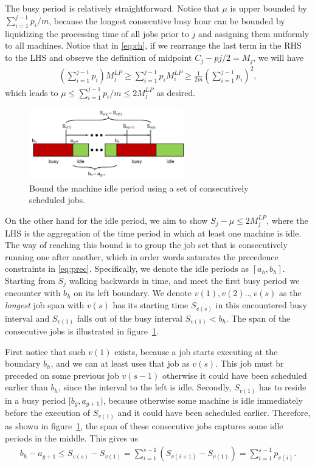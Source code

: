 The busy period is relatively straightforward. Notice that $\mu$ is upper bounded by $\sum_{i=1}^{j-1} p_i /m$, because the longest consecutive busy hour can be bounded by liquidizing the processing time of all jobs prior to $j$ and assigning them uniformly to all machines. Notice that in \eqref{eq:ch}, if we rearrange the last term in the RHS to the LHS and observe the definition of midpoint $C_j-pj/2 = M_j$, we will have 
\begin{align}
\left(\sum_{i=1}^{j-1}p_i\right)M^{LP}_j \geq \sum_{i=1}^{j-1} p_i M^{LP}_i \geq \frac{1}{2m}\left(\sum_{i=1}^{j-1}p_i\right)^2,
\end{align}
which leads to $\mu \leq \sum_{i=1}^{j-1} p_i /m \leq 2 M^{LP}_j$ as desired. 

\begin{figure}[h]
	\centering
	\includegraphics[width=0.6\textwidth]{figs/4-approx-1.pdf}
	\caption{Bound the machine idle period using a set of consecutively scheduled jobs.}
	\label{fig:4-approx}
\end{figure}

On the other hand for the idle period, we aim to show $S_j - \mu \leq 2 M^{LP}_j$, where the LHS is the aggregation of the time period in which at least one machine is idle. The way of reaching this bound is to group the job set that is consecutively running one after another, which in order words saturates the precedence constraints in \eqref{eq:prec}. Specifically, we denote the idle periods as $[a_h, b_h]$. Starting from $S_j$ walking backwards in time, and meet the first busy period we encounter with $b_h$ on its left boundary. We denote $v(1), v(2) .., v(s)$ as the \emph{longest} job span with $v(s)$ has its starting time $S_{v(s)}$ in this encountered busy interval and $S_{v(1)}$ falls out of the busy interval $S_{v(1)} < b_h$. The span of the consecutive jobs is illustrated in figure~\ref{fig:4-approx}. 

First notice that such $v(1)$ exists, because a job starts executing at the boundary $b_h$, and we can at least uses that job as $v(s)$. This job must br preceded on some previous job $v(s-1)$ otherwise it could have been scheduled earlier than $b_h$, since the interval to the left is idle. Secondly, $S_{v(1)}$ has to reside in a busy period $[b_g, a_{g+1})$, because otherwise some machine is idle immediately before the execution of $S_{v(1)}$ and it could have been scheduled earlier. Therefore, as shown in figure~\ref{fig:4-approx}, the span of these consecutive jobs captures some idle periods in the middle. This gives us 
\begin{align}
b_h - a_{g+1} \leq S_{v(s)} - S_{v(1)} = \sum_{i=1}^{s-1}(S_{v(i+1)} - S_{v(1)}) = \sum_{i=1}^{s-1} p_{v(i)}. \label{eq:jobset}
\end{align}

